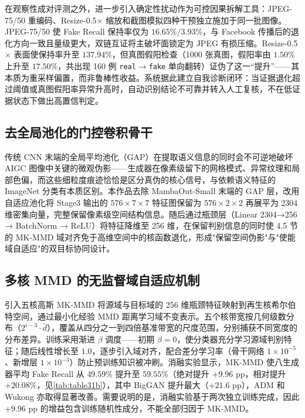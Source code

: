 \documentclass[UTF8, a4paper, 12pt]{ctexart}
\begin{document}
在观察性成对评测之外，进一步引入确定性扰动作为可控因果拆解工具：JPEG-75/50 重编码、Resize-0.5$\times$ 缩放和截图模拟四种干预独立施加于同一批图像。JPEG-75/50 使 Fake Recall 保持率仅为 $16.65\%/3.93\%$，与 Facebook 传播后的退化方向一致且量级更大，双链互证将主破坏面锁定为 JPEG 有损压缩。Resize-0.5$\times$ 表面使保持率升至 $137.94\%$，但真图假阳检查（1000 张真图，假阳率由 $1.50\%$ 上升至 $17.50\%$，共出现 160 例 \texttt{real}$\rightarrow$\texttt{fake} 单向翻转）证伪了这一``提升''——其本质为重采样偏置，而非鲁棒性收益。系统据此建立自我诊断闭环：当证据退化超过阈值或真图假阳率异常升高时，自动识别结论不可靠并转入人工复核，不在低证据状态下做出高置信判定。

\subsection{去全局池化的门控卷积骨干}

传统 CNN 末端的全局平均池化（GAP）在提取语义信息的同时会不可逆地破坏 AIGC 图像中关键的微观伪影——生成器在像素级留下的网格模式、异常纹理和局部色偏，而这些细粒度痕迹恰恰是区分真伪的核心信号，与依赖语义特征的 ImageNet 分类有本质区别。本作品去除 MambaOut-Small 末端的 GAP 层，改用自适应池化将 Stage3 输出的 \(576 \times 7 \times 7\) 特征图保留为 \(576 \times 2 \times 2\) 再展平为 2304 维密集向量，完整保留像素级空间结构信息。随后通过瓶颈层（Linear 2304→256 → BatchNorm → ReLU）将特征降维至 256 维，在保留判别信息的同时使 4.5 节的 MK-MMD 域对齐免于高维空间中的核函数退化，形成"保留空间伪影"与"使能域自适应"的双目标协同设计。

\subsection{多核 MMD 的无监督域自适应机制}
\label{sec:innovation-mkmmd}

引入五核高斯 MK-MMD 将源域与目标域的 256 维瓶颈特征映射到再生核希尔伯特空间，通过最小化经验 MMD 距离学习域不变表示。五个核带宽按几何级数分布（$2^{i-3}\cdot\bar{d}$），覆盖从四分之一到四倍基准带宽的尺度范围，分别捕获不同宽度的分布差异。训练采用渐进 $\beta$ 调度——初期 $\beta=0$，使分类器充分学习源域判别特征；随后线性增长至 $1.0$，逐步引入域对齐，配合差分学习率（骨干网络 $1\times10^{-5}$、新增层 $1\times10^{-3}$）防止预训练知识被冲刷。消融实验显示，MK-MMD 使八生成器平均 Fake Recall 从 $49.59\%$ 提升至 $59.55\%$（绝对提升 $+9.96$ pp，相对提升 $+20.08\%$，见\cref{tab:table31b}），其中 BigGAN 提升最大（$+21.6$ pp），ADM 和 Wukong 亦取得显著改善。需要说明的是，消融实验基于两次独立训练完成，因此 $+9.96$ pp 的增益包含训练随机性成分，不能全部归因于 MK-MMD。
\end{document}
